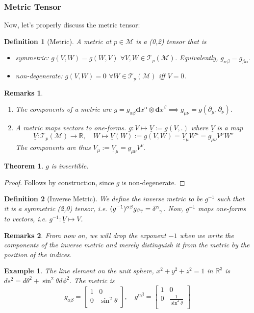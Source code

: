 \documentclass[a4paper]{article}
\newtheorem{eg}{Example}[section]
\newtheorem{remarks}{Remarks}[section]
\theoremstyle{new}
\newtheorem{defi}{Definition}[section]
\newtheorem{thm}{Theorem}[section]
\begin{document}
\subsubsection{Metric Tensor}
Now, let's properly discuss the metric tensor:
\begin{defi}[Metric]
A metric at $p\in\mathcal{M}$ is a (0,2) tensor that is
\begin{itemize}
    \item symmetric: $g(V,W)=g(W,V)$
    $\forall V,W\in\mathcal{T}_p(\mathcal{M})$. Equivalently, $g_{\alpha\beta}=g_{\beta\alpha}$.
    \item non-degenerate:
    $g(V,W)=0$     $\forall W\in\mathcal{T}_p(\mathcal{M})$ iff $V=0$.
\end{itemize}
\end{defi}
\begin{remarks}\leavevmode
\begin{enumerate}
    \item The components of a metric are $g=g_{\alpha\beta}\mathbf{d}x^\alpha\otimes\mathbf{d}x^\beta\implies g_{\mu\nu}=g(\partial_\mu,\partial_\nu)$.
    \item A metric maps vectors to one-forms. $g:V\mapsto \underline{V}:=g(V,.)$ where $\underline{V}$ is a map
$$\underline{V}:\mathcal{T}_p(\mathcal{M})\rightarrow\mathbb{R},\quad W\mapsto\underline{V}(W):=g(V,W)=\underline{V}_\mu W^\mu=g_{\mu\nu}V^\mu W^\nu$$
    The components are thus $V_\mu:=\underline{V}_\mu=g_{\mu\nu}V^\nu$.
    \end{enumerate}
\end{remarks}
\begin{thm}
$g$ is invertible.
\end{thm}
\begin{proof}
Follows by construction, since $g$ is non-degenerate.
\end{proof}
\begin{defi}[Inverse Metric]
We define the inverse metric to be $g^{-1}$ such that it is a symmetric (2,0) tensor, i.e. $(g^{-1})^{\alpha\beta}g_{\beta\gamma}=\tensor*{\delta}{*_{}^{\alpha}_{\gamma}}$. Now,  $g^{-1}$ maps one-forms to vectors, i.e. $g^{-1}:\underline{V}\mapsto V$.
\end{defi}
\begin{remarks}
From now on, we will drop the exponent $−1$ when we write the components of the inverse metric and merely distinguish it from the metric by the position of the indices.
\end{remarks}
\begin{eg}
The line element on the unit sphere, $x^2+y^2+z^2=1$ in $\mathbb{R}^3$ is $ds^2=d\theta^2+\sin^2\theta d\phi^2$. The metric is
$$g_{\alpha\beta}=\begin{bmatrix}1&0\\0&\sin^2\theta\\\end{bmatrix},\quad g^{\alpha\beta}=\begin{bmatrix}1&0\\0&\frac{1}{\sin^2\theta}\\\end{bmatrix}$$
\end{eg}
\end{document}

